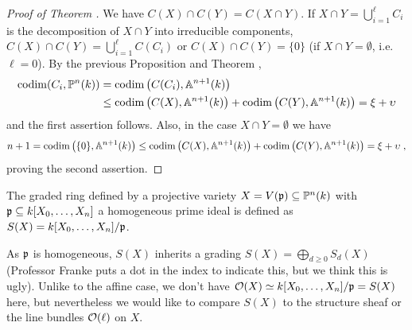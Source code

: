 \documentclass[a4paper,parskip=half,numbers=enddot, DIV=12]{scrreprt}
\begin{document}
\begin{proof}[Proof of Theorem ]
    We have $C(X)\cap C(Y) = C(X\cap Y)$. If $X\cap Y= \bigcup_{i=1}^\ell C_i$ is the decomposition of $X\cap Y$ into irreducible components, $C(X)\cap C(Y) = \bigcup_{i=1}^\ell C(C_i)$ or $C(X) \cap C(Y) = \{0\}$ (if $X\cap Y=\emptyset$, i.e.\ $\ell=0$). By the previous Proposition and Theorem , 
    \begin{align*}
    	 \operatorname{codim}(C_i, \mathbb{P}^n(k)) &= \operatorname{codim}\big(C(C_i), \mathbb{A}^{n+1}(k)\big)\\
    	 & \leq \operatorname{codim}\big(C(X), \mathbb{A}^{n+1}(k)\big) +\operatorname{codim}\big(C(Y), \mathbb{A}^{n+1}(k)\big)= \xi+\upsilon 
    \end{align*}
   and the first assertion follows. Also, in the case $X\cap Y =\emptyset$ we have 
   \begin{align*}
	   	n+1 = \operatorname{codim}\big(\{0\}, \mathbb{A}^{n+1}(k)\big) \leq \operatorname{codim}\big(C(X),\mathbb{A}^{n+1}(k)\big)+\operatorname{codim}\big(C(Y), \mathbb{A}^{n+1}(k)\big) = \xi +\upsilon\;, 
   \end{align*}
   proving the second assertion.
\end{proof}
\begin{defi}
    The graded ring defined by a projective variety $X= V(\mathfrak{p}) \subseteq \mathbb{P}^n(k)$ with $\mathfrak{p}\subseteq k[X_0,\ldots,X_n]$ a homogeneous prime ideal is defined as $S(X) = k[X_0,\ldots, X_n]/\mathfrak{p}$. 
\end{defi}
As $\mathfrak{p}$ is homogeneous, $S(X)$ inherits a grading $S(X)=\bigoplus_{d\geq 0}S_d(X)$ (Professor Franke puts a dot in the index to indicate this, but we think this is ugly). Unlike to the affine case, we don't have $\mathcal{O}(X)\simeq k[X_0,\ldots,X_n]/\mathfrak{p}=S(X)$ here, but nevertheless we would like to compare $S(X)$ to the structure sheaf or the line bundles $\mathcal{O}(\ell)$ on $X$.
\end{document}

